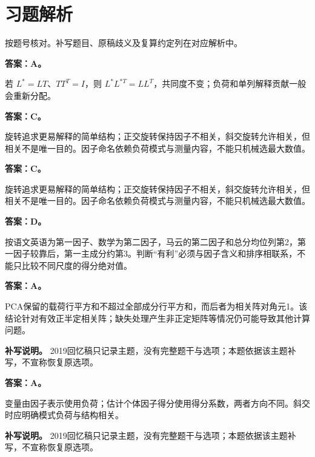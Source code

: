 \clearpage\section{习题解析}

\begin{keyidea}[核对方式]按题号核对。补写题目、原稿歧义及复算约定列在对应解析中。\end{keyidea}


\textbf{答案：A。}

若 \(L^*=LT\)、\(TT^T=I\)，则 \(L^*L^{*T}=LL^T\)，共同度不变；负荷和单列解释贡献一般会重新分配。



\textbf{答案：C。}

旋转追求更易解释的简单结构；正交旋转保持因子不相关，斜交旋转允许相关，但相关不是唯一目的。因子命名依赖负荷模式与测量内容，不能只机械选最大数值。



\textbf{答案：C。}

旋转追求更易解释的简单结构；正交旋转保持因子不相关，斜交旋转允许相关，但相关不是唯一目的。因子命名依赖负荷模式与测量内容，不能只机械选最大数值。



\textbf{答案：D。}

按语文英语为第一因子、数学为第二因子，马云的第二因子和总分均位列第2，第一因子较靠后，第一主成分约第3。判断``有利''必须与因子含义和排序相联系，不能只比较不同尺度的得分绝对值。



\textbf{答案：A。}

PCA保留的载荷行平方和不超过全部成分行平方和，而后者为相关阵对角元1。该结论针对有效正半定相关阵；缺失处理产生非正定矩阵等情况仍可能导致其他计算问题。


\textbf{补写说明。} 2019回忆稿只记录主题，没有完整题干与选项；本题依据该主题补写，不宣称恢复原选项。



\textbf{答案：A。}

变量由因子表示使用负荷；估计个体因子得分使用得分系数，两者方向不同。斜交时应明确模式负荷与结构相关。


\textbf{补写说明。} 2019回忆稿只记录主题，没有完整题干与选项；本题依据该主题补写，不宣称恢复原选项。


